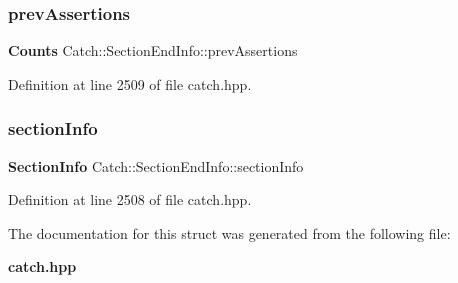 \subsubsection{prevAssertions}
{\footnotesize\ttfamily \textbf{ Counts} Catch\+::\+Section\+End\+Info\+::prev\+Assertions}



Definition at line 2509 of file catch.\+hpp.

\mbox{\label{struct_catch_1_1_section_end_info_a2d44793392cb83735d086d726822abe9}} 
\subsubsection{sectionInfo}
{\footnotesize\ttfamily \textbf{ Section\+Info} Catch\+::\+Section\+End\+Info\+::section\+Info}



Definition at line 2508 of file catch.\+hpp.



The documentation for this struct was generated from the following file\+:\begin{DoxyCompactItemize}
\item 
\textbf{ catch.\+hpp}\end{DoxyCompactItemize}

